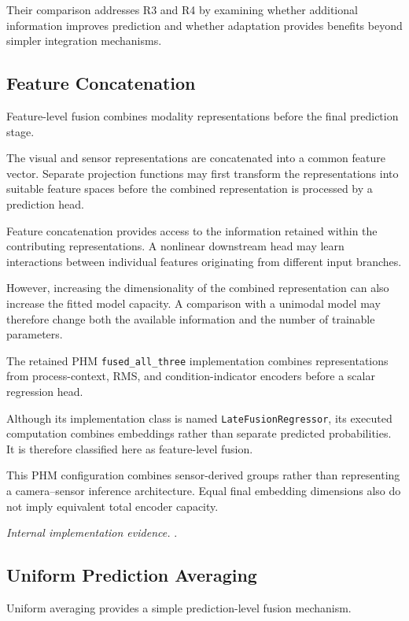 Their comparison addresses R3 and R4 by examining whether additional information improves prediction and whether adaptation provides benefits beyond simpler integration mechanisms.

\subsection{Feature Concatenation}

Feature-level fusion combines modality representations before the final prediction stage.

The visual and sensor representations are concatenated into a common feature vector. Separate projection functions may first transform the representations into suitable feature spaces before the combined representation is processed by a prediction head.

Feature concatenation provides access to the information retained within the contributing representations. A nonlinear downstream head may learn interactions between individual features originating from different input branches.

However, increasing the dimensionality of the combined representation can also increase the fitted model capacity. A comparison with a unimodal model may therefore change both the available information and the number of trainable parameters.

The retained PHM \texttt{fused\_all\_three} implementation combines representations from process-context, RMS, and condition-indicator encoders before a scalar regression head.

Although its implementation class is named \texttt{LateFusionRegressor}, its executed computation combines embeddings rather than separate predicted probabilities. It is therefore classified here as feature-level fusion.

This PHM configuration combines sensor-derived groups rather than representing a camera–sensor inference architecture. Equal final embedding dimensions also do not imply equivalent total encoder capacity.

\noindent\textit{Internal implementation evidence.} .

\subsection{Uniform Prediction Averaging}

Uniform averaging provides a simple prediction-level fusion mechanism.

